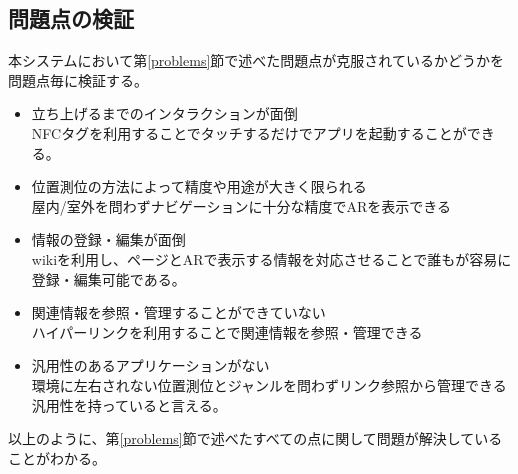 \subsection{問題点の検証}
本システムにおいて第\ref{problems}節で述べた問題点が克服されているかどうかを問題点毎に検証する。
\begin{itemize}
  \item 立ち上げるまでのインタラクションが面倒 \\
  NFCタグを利用することでタッチするだけでアプリを起動することができる。
  \item 位置測位の方法によって精度や用途が大きく限られる \\
  屋内/室外を問わずナビゲーションに十分な精度でARを表示できる
  \item 情報の登録・編集が面倒 \\
  wikiを利用し、ページとARで表示する情報を対応させることで誰もが容易に登録・編集可能である。
  \item 関連情報を参照・管理することができていない \\
  ハイパーリンクを利用することで関連情報を参照・管理できる
  \item 汎用性のあるアプリケーションがない \\
  環境に左右されない位置測位とジャンルを問わずリンク参照から管理できる汎用性を持っていると言える。
\end{itemize}
以上のように、第\ref{problems}節で述べたすべての点に関して問題が解決していることがわかる。
